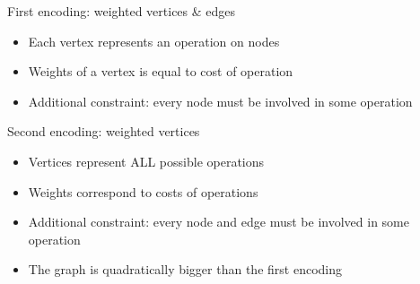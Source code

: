 \documentclass{beamer}
\begin{document}
\begin{frame}{First encoding: weighted vertices \& edges}
  \begin{itemize}
  \item Each vertex represents an operation on nodes
  \item Weights of a vertex is equal to cost of operation
  \item Additional constraint: every node must be involved in some operation
  \end{itemize}
\end{frame}
\begin{frame}{Second encoding: weighted vertices}
\begin{itemize}
\item Vertices represent ALL possible operations
\item Weights correspond to costs of operations
\item Additional constraint: every node and edge must be involved in some operation
\item The graph is quadratically bigger than the first encoding
\end{itemize}
\end{frame}
\end{document}
